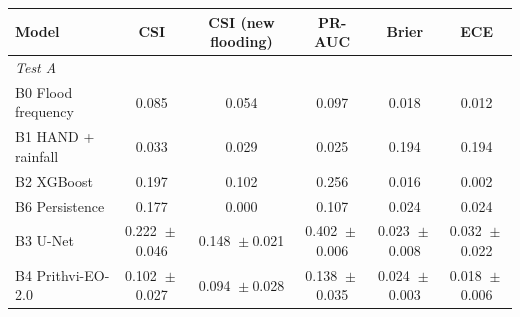 \begin{tabular}{lccccc}
\toprule
Model & CSI & CSI (new flooding) & PR-AUC & Brier & ECE \\
\midrule
\multicolumn{6}{l}{\textit{Test A}} \\
B0 Flood frequency
& 0.085%
& 0.054%
& 0.097%
& 0.018%
& 0.012%
\\
B1 HAND + rainfall
& 0.033%
& 0.029%
& 0.025%
& 0.194%
& 0.194%
\\
B2 XGBoost
& 0.197%
& 0.102%
& 0.256%
& 0.016%
& 0.002%
\\
B6 Persistence
& 0.177%
& 0.000%
& 0.107%
& 0.024%
& 0.024%
\\
B3 U-Net
& 0.222%
${}\pm{}$0.046%
& 0.148%
${}\pm{}$0.021%
& 0.402%
${}\pm{}$0.006%
& 0.023%
${}\pm{}$0.008%
& 0.032%
${}\pm{}$0.022%
\\
B4 Prithvi-EO-2.0
& 0.102%
${}\pm{}$0.027%
& 0.094%
${}\pm{}$0.028%
& 0.138%
${}\pm{}$0.035%
& 0.024%
${}\pm{}$0.003%
& 0.018%
${}\pm{}$0.006%

\end{tabular}
